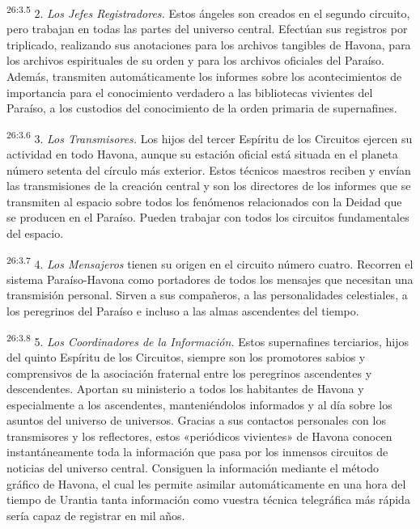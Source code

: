 \par
\textsuperscript{26:3.5} 2. \textit{Los Jefes Registradores.} Estos ángeles son creados en el segundo circuito, pero trabajan en todas las partes del universo central. Efectúan sus registros por triplicado, realizando sus anotaciones para los archivos tangibles de Havona, para los archivos espirituales de su orden y para los archivos oficiales del Paraíso. Además, transmiten automáticamente los informes sobre los acontecimientos de importancia para el conocimiento verdadero a las bibliotecas vivientes del Paraíso, a los custodios del conocimiento de la orden primaria de supernafines.

\par
\textsuperscript{26:3.6} 3. \textit{Los Transmisores.} Los hijos del tercer Espíritu de los Circuitos ejercen su actividad en todo Havona, aunque su estación oficial está situada en el planeta número setenta del círculo más exterior. Estos técnicos maestros reciben y envían las transmisiones de la creación central y son los directores de los informes que se transmiten al espacio sobre todos los fenómenos relacionados con la Deidad que se producen en el Paraíso. Pueden trabajar con todos los circuitos fundamentales del espacio.

\par
\textsuperscript{26:3.7} 4. \textit{Los Mensajeros} tienen su origen en el circuito número cuatro. Recorren el sistema Paraíso-Havona como portadores de todos los mensajes que necesitan una transmisión personal. Sirven a sus compañeros, a las personalidades celestiales, a los peregrinos del Paraíso e incluso a las almas ascendentes del tiempo.

\par
\textsuperscript{26:3.8} 5. \textit{Los Coordinadores de la Información.} Estos supernafines terciarios, hijos del quinto Espíritu de los Circuitos, siempre son los promotores sabios y comprensivos de la asociación fraternal entre los peregrinos ascendentes y descendentes. Aportan su ministerio a todos los habitantes de Havona y especialmente a los ascendentes, manteniéndolos informados y al día sobre los asuntos del universo de universos. Gracias a sus contactos personales con los transmisores y los reflectores, estos «periódicos vivientes» de Havona conocen instantáneamente toda la información que pasa por los inmensos circuitos de noticias del universo central. Consiguen la información mediante el método gráfico de Havona, el cual les permite asimilar automáticamente en una hora del tiempo de Urantia tanta información como vuestra técnica telegráfica más rápida sería capaz de registrar en mil años.

